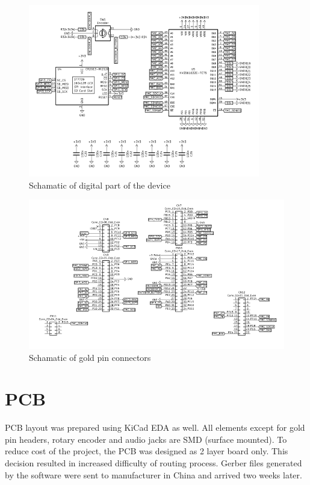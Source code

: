 \documentclass[a4paper,twoside,12pt]{book}
\begin{document}
\begin{figure}[H]
    \centering
    \includegraphics[width=0.9\textwidth]{images/Schematic_digital}
    \caption{Schamatic of digital part of the device}
    \label{fig:Schematic2}
\end{figure}

\begin{figure}[H]
    \centering
    \includegraphics[width=\textwidth]{images/Schematic_connectors}
    \caption{Schamatic of gold pin connectors}
    \label{fig:Schematic3}
\end{figure}

\section{PCB}
PCB layout was prepared using KiCad EDA as well.
All elements except for gold pin headers,
rotary encoder and audio jacks are SMD (surface mounted).
To reduce cost of the project, the PCB was designed as 2 layer board only.
This decision resulted in increased difficulty of routing process.
Gerber files generated by the software were sent to manufacturer in China
and arrived two weeks later.
\end{document}
